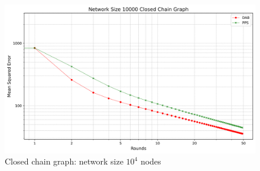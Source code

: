 \begin{figure}[H]
    \centering
    \includegraphics[scale=0.5]{figures/closedChainSimulations/DAB_vs_PPS_CCG_r50_n10000.png}
    \caption{Closed chain graph: network size $10^{4}$ nodes}
    \label{fig:10000ChainGraph}
\end{figure}

